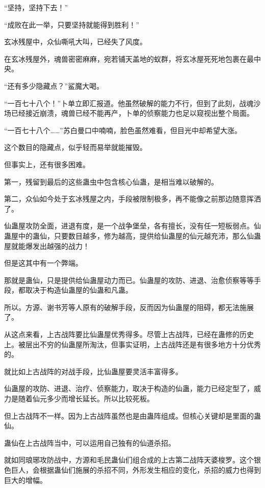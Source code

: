 
\begin{this_body}



“坚持，坚持下去！”

“成败在此一举，只要坚持就能得到胜利！”

玄冰残屋中，众仙嘶吼大叫，已经失了风度。

在玄冰残屋外，魂兽密密麻麻，宛若铺天盖地的蚁群，将玄冰屋死死地包裹在最中央。

“还有多少隐藏点？”鲨魔大喝。

“一百七十八个！”卜单立即汇报道。他虽然破解的能力不行，但到了此刻，战魂沙场已经接近崩溃，魂兽已经不能再产，卜单的侦察能力也足以窥视出整个局面。

“一百七十八个……”苏白曼口中喃喃，脸色虽然难看，但目光中却希望大涨。

这个数目的隐藏点，似乎轻而易举就能摧毁。

但事实上，还有很多困难。

第一，残留到最后的这些蛊虫中包含核心仙蛊，是相当难以破解的。

第二，众仙如今处于玄冰残屋之内，手段被限制极多，再不能像之前那边随意挥洒了。

仙蛊屋攻防全面，进退有度，是一个战争堡垒，各有擅长，没有任一短板弱点。仙蛊屋中的蛊仙，只要数目越多，修为越高，提供给仙蛊屋的仙元越充沛，那么仙蛊屋就能爆发出越强的战力！

但是这其中有一个弊端。

那就是蛊仙，只是提供给仙蛊屋动力而已。仙蛊屋的攻防、进退、治愈侦察等等手段，都取决于构造仙蛊屋的仙蛊和凡蛊。

所以。方源、谢书芳等人原有的破解手段，反而因为仙蛊屋的阻碍，都无法施展了。

从这点来看，上古战阵要比仙蛊屋优秀得多。尽管上古战阵，已经在蛊修的历史上。被层出不穷的仙蛊屋所淘汰，但事实证明，上古战阵还是有很多地方十分优秀的。

就比如上古战阵的对战手段，比仙蛊屋要灵活丰富得多。

仙蛊屋的攻防、进退、治疗、侦察能力，取决于构造的仙蛊，能力已经定型了，威力是随着仙元多少而增长延长。所以比较死板。

但上古战阵不一样。因为上古战阵虽然也是由蛊阵组成。但核心关键却是里面的蛊仙。

蛊仙在上古战阵当中，可以运用自己独有的仙道杀招。

就如同琅琊攻防战中，方源和毛民蛊仙们组合成的上古第二战阵天婆梭罗。这个银色巨人，会根据蛊仙们施展的杀招不同，外形发生相应的变化，杀招的威力也得到巨大的增幅。


\end{this_body}
